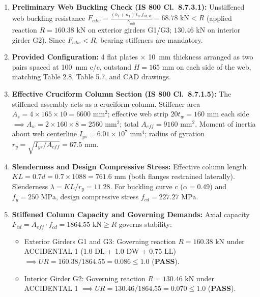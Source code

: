\documentclass[12pt,a4paper]{report}
\numberwithin{table}{chapter}
\numberwithin{figure}{chapter}
\newcommand{\passBadge}{\colorbox{passBg}{\textcolor{passGreen}{\textbf{PASS}}}}
\begin{document}
\begin{engInfoBox}
\begin{enumerate}[label=(\alph*),leftmargin=1.8em,itemsep=1pt,topsep=2pt]
\item \textbf{Preliminary Web Buckling Check (IS 800 Cl.~8.7.3.1):} Unstiffened web buckling resistance $F_{cdw} = \frac{(b_1 + n_1)\,t_w\,f_{cd,w}}{\gamma_{m0}} = 68.78\text{ kN} < R$ (applied reaction $R = 160.38\text{ kN}$ on exterior girders G1/G3; $130.46\text{ kN}$ on interior girder G2). Since $F_{cdw} < R$, bearing stiffeners are mandatory.
\item \textbf{Provided Configuration:} 4 flat plates $\times$ 10~mm thickness arranged as two pairs spaced at 100~mm c/c, outstand $H = 165\text{ mm}$ on each side of the web, matching Table 2.8, Table 5.7, and CAD drawings.
\item \textbf{Effective Cruciform Column Section (IS 800 Cl.~8.7.1.5):} The stiffened assembly acts as a cruciform column. Stiffener area $A_s = 4 \times 165 \times 10 = 6600\text{ mm}^2$; effective web strip $20 t_w = 160\text{ mm}$ each side $\implies A_w = 2 \times 160 \times 8 = 2560\text{ mm}^2$; total $A_{eff} = 9160\text{ mm}^2$. Moment of inertia about web centerline $I_{ys} = 6.01 \times 10^7\text{ mm}^4$; radius of gyration $r_y = \sqrt{I_{ys}/A_{eff}} = 67.5\text{ mm}$.
\item \textbf{Slenderness and Design Compressive Stress:} Effective column length $KL = 0.7 d = 0.7 \times 1088 = 761.6\text{ mm}$ (both flanges restrained laterally). Slenderness $\lambda = KL / r_y = 11.28$. For buckling curve c ($\alpha = 0.49$) and $f_y = 250\text{ MPa}$, design compressive stress $f_{cd} = 227.27\text{ MPa}$.
\item \textbf{Stiffened Column Capacity and Governing Demands:} Axial capacity $F_{cd} = A_{eff} \cdot f_{cd} = 1864.55\text{ kN} \geq R$ governs stability:
\begin{itemize}
\item Exterior Girders G1 and G3: Governing reaction $R = 160.38\text{ kN}$ under ACCIDENTAL 1 (1.0 DL + 1.0 DW + 0.75 LL) $\implies UR = 160.38 / 1864.55 = 0.086 \le 1.0$ (\passBadge{}).
\item Interior Girder G2: Governing reaction $R = 130.46\text{ kN}$ under ACCIDENTAL 1 $\implies UR = 130.46 / 1864.55 = 0.070 \le 1.0$ (\passBadge{}).
\end{itemize}
\end{enumerate}
\end{engInfoBox}
\end{document}
